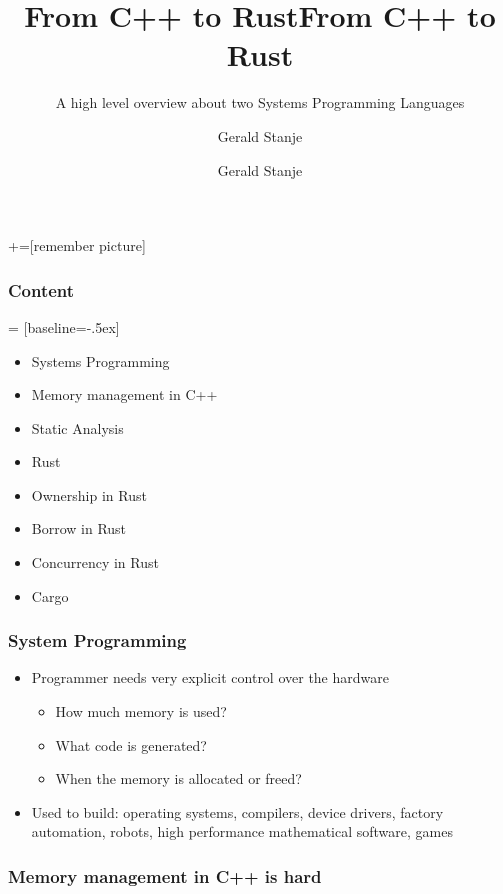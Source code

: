 \documentclass{beamer} %
\author{Gerald Stanje}
\title{From C++ to Rust}
\title[] %
{From C++ to Rust}
\subtitle{A high level overview about two Systems Programming Languages}
\author[] %
{Gerald Stanje}
\begin{document}
\frame{\titlepage}

+=[remember picture]

\everymath{\displaystyle}

\begin{frame}
\frametitle{Content}

 = [baseline=-.5ex]

\begin{itemize}
    \item Systems Programming
    \item Memory management in C++
    \item Static Analysis
    \item Rust
    \item Ownership in Rust
    \item Borrow in Rust
    \item Concurrency in Rust
    \item Cargo
\end{itemize}

\end{frame}

\begin{frame}
\frametitle{System Programming}

\begin{itemize}
    \item Programmer needs very explicit control over the hardware
    \begin{itemize}
    	\item How much memory is used?
	\item What code is generated?
	\item When the memory is allocated or freed?
    \end{itemize}
    \item Used to build: operating systems, compilers, device drivers, factory automation, robots, high performance mathematical software, games
\end{itemize}

\end{frame}

\begin{frame}
\frametitle{Memory management in C++ is hard}


\end{frame}
\end{document}
